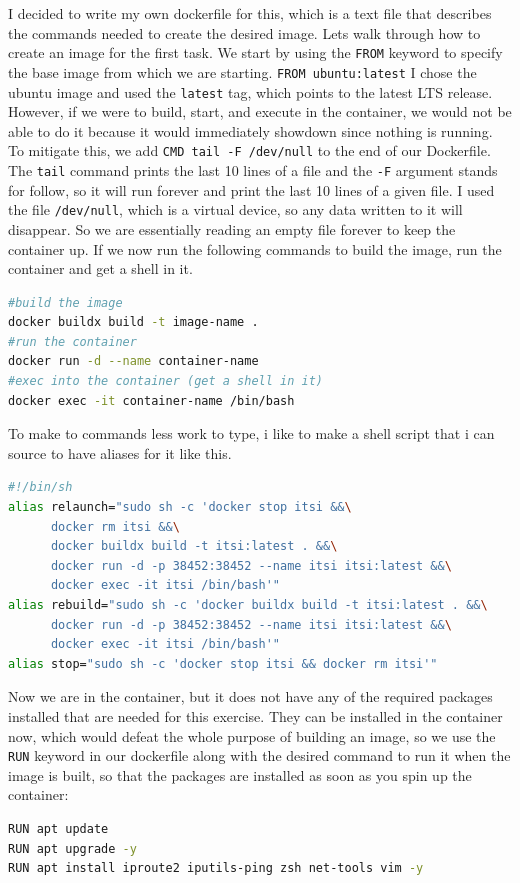 \documentclass[a4paper]{article}
\newcommand{\abc}{\hfill \break}
\begin{document}
I decided to write my own dockerfile for this, which is a text file that describes the commands needed to create the desired image. Lets walk through how to create an image for the first task. \abc
We start by using the \texttt{FROM} keyword to specify the base image \cite{docker-glossary} from which we are starting.
\abc
\texttt{FROM ubuntu:latest} \abc
I chose the ubuntu image \cite{ubuntu} and used the \texttt{latest} tag, which points to the latest LTS release.\abc
However, if we were to build, start, and execute in the container, we would not be able to do it because it would immediately showdown since nothing is running. \abc
To mitigate this, we add \texttt{CMD tail -F /dev/null} to the end of our Dockerfile. The \texttt{tail} command prints the last 10 lines of a file and the \texttt{-F} argument stands for follow, so it will run forever and print the last 10 lines of a given file.\cite{tail} I used the file \texttt{/dev/null}, which is a virtual device, so any data written to it will disappear. \cite{devnull} So we are essentially reading an empty file forever to keep the container up. \abc
If we now run the following commands to build the image, run the container and get a shell in it.
\begin{lstlisting}[language=bash]
#build the image
docker buildx build -t image-name .
#run the container
docker run -d --name container-name 
#exec into the container (get a shell in it)
docker exec -it container-name /bin/bash
\end{lstlisting}
To make to commands less work to type, i like to make a shell script that i can source to have aliases for it like this.
\begin{lstlisting}[language=bash]
#!/bin/sh
alias relaunch="sudo sh -c 'docker stop itsi &&\
      docker rm itsi &&\
      docker buildx build -t itsi:latest . &&\
      docker run -d -p 38452:38452 --name itsi itsi:latest &&\
      docker exec -it itsi /bin/bash'"
alias rebuild="sudo sh -c 'docker buildx build -t itsi:latest . &&\
      docker run -d -p 38452:38452 --name itsi itsi:latest &&\
      docker exec -it itsi /bin/bash'"
alias stop="sudo sh -c 'docker stop itsi && docker rm itsi'"
\end{lstlisting}
Now we are in the container, but it does not have any of the required packages installed that are needed for this exercise. They can be installed in the container now, which would defeat the whole purpose of building an image, so we use the \texttt{RUN} keyword in our dockerfile along with the desired command to run it when the image is built, so that the packages are installed as soon as you spin up the container:
\begin{lstlisting}[language=bash]
RUN apt update 
RUN apt upgrade -y
RUN apt install iproute2 iputils-ping zsh net-tools vim -y
\end{lstlisting}
\newpage
\end{document}
